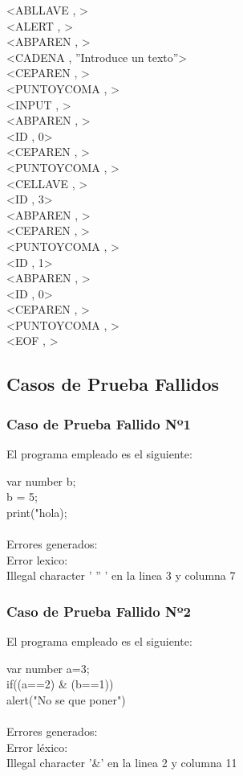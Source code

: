 \documentclass{article}
\begin{document}
\begin{flushleft}
<ABLLAVE , >\\
<ALERT , >\\
<ABPAREN , >\\
<CADENA , ''Introduce un texto''>\\
<CEPAREN , >\\
<PUNTOYCOMA , >\\
<INPUT , >\\
<ABPAREN , >\\
<ID , 0>\\
<CEPAREN , >\\
<PUNTOYCOMA , >\\
<CELLAVE , >\\
<ID , 3>\\
<ABPAREN , >\\
<CEPAREN , >\\
<PUNTOYCOMA , >\\
<ID , 1>\\
<ABPAREN , >\\
<ID , 0>\\
<CEPAREN , >\\
<PUNTOYCOMA , >\\
<EOF , >\\
\end{flushleft}


\subsection{Casos de Prueba Fallidos}


\subsubsection{Caso de Prueba Fallido Nº1}
\begin{center} 
El programa empleado es el siguiente:
\end{center}
\begin{flushleft}
var number b;\\
b = 5;\\
print("hola);\\
\quad\\
Errores generados:\\
Error lexico: \\
	\qquad Illegal character ' '' ' en la linea 3 y columna 7
\end{flushleft}

\subsubsection{Caso de Prueba Fallido Nº2}
\begin{center} 
El programa empleado es el siguiente:
\end{center}
\begin{flushleft}
var number a=3;\\
if((a==2) \& (b==1))\\
alert("No se que poner")\\
\quad\\
Errores generados:\\
Error léxico: \\
\qquad Illegal character '\&' en la linea 2 y columna 11
\end{flushleft}
\clearpage
\end{document}
